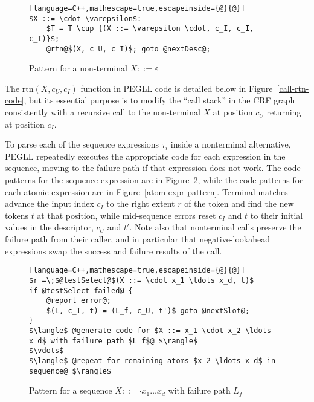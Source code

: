 \documentclass{article}
\begin{document}
\begin{figure}
\caption[Empty non-terminal code pattern]{Pattern for a non-terminal $X ::= \varepsilon$} \label{empty-nt-pattern}
\begin{lstlisting}[language=C++,mathescape=true,escapeinside={@}{@}]
$X ::= \cdot \varepsilon$:
	$T = T \cup {(X ::= \varepsilon \cdot, c_I, c_I, c_I)}$;
	@rtn@$(X, c_U, c_I)$; goto @nextDesc@;
\end{lstlisting}
\end{figure}

The rtn$(X, c_U, c_I)$ function in PEGLL code is detailed below in Figure~\ref{call-rtn-code}, but its essential purpose is to modify the ``call stack'' in the CRF graph consistently with a recursive call to the non-terminal $X$ at position $c_U$ returning at position $c_I$.

To parse each of the sequence expressions $\tau_i$ inside a nonterminal alternative, PEGLL repeatedly executes the appropriate code for each expression in the sequence, moving to the failure path if that expression does not work. 
The code patterns for the sequence expression are in Figure~\ref{seq-expr-pattern}, while the code patterns for each atomic expression are in Figure~\ref{atom-expr-pattern}. 
Terminal matches advance the input index $c_I$ to the right extent $r$ of the token and find the new tokens $t$ at that position, while mid-sequence errors reset $c_I$ and $t$ to their initial values in the descriptor, $c_U$ and $t'$.
Note also that nonterminal calls preserve the failure path from their caller, and in particular that negative-lookahead expressions swap the success and failure results of the call.

\begin{figure}
\caption[Sequence expression code pattern]{Pattern for a sequence $X ::= \cdot x_1 \ldots x_d$ with failure path $L_f$} \label{seq-expr-pattern}
\begin{lstlisting}[language=C++,mathescape=true,escapeinside={@}{@}]
$r =\;$@testSelect@$(X ::= \cdot x_1 \ldots x_d, t)$
if @testSelect failed@ {
	@report error@;
	$(L, c_I, t) = (L_f, c_U, t')$ goto @nextSlot@;
}
$\langle$ @generate code for $X ::= x_1 \cdot x_2 \ldots x_d$ with failure path $L_f$@ $\rangle$
$\vdots$
$\langle$ @repeat for remaining atoms $x_2 \ldots x_d$ in sequence@ $\rangle$
\end{lstlisting}
\end{figure}
\end{document}
